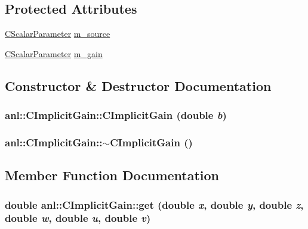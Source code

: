 \subsection*{Protected Attributes}
\begin{DoxyCompactItemize}
\item 
\hyperlink{classanl_1_1CScalarParameter}{CScalarParameter} \hyperlink{classanl_1_1CImplicitGain_aa89db53619f2caf1ef0dc1326694ba25}{m\_\-source}
\item 
\hyperlink{classanl_1_1CScalarParameter}{CScalarParameter} \hyperlink{classanl_1_1CImplicitGain_ac25c14cb85588a9449a3e0f3b0b35125}{m\_\-gain}
\end{DoxyCompactItemize}


\subsection{Constructor \& Destructor Documentation}
\hypertarget{classanl_1_1CImplicitGain_a5ebbb4ec7a16135c9ecad481ccc85ce2}{
\subsubsection[{CImplicitGain}]{\setlength{\rightskip}{0pt plus 5cm}anl::CImplicitGain::CImplicitGain (double {\em b})}}
\label{classanl_1_1CImplicitGain_a5ebbb4ec7a16135c9ecad481ccc85ce2}
\hypertarget{classanl_1_1CImplicitGain_a156654b778ec4b9ae3c8e43ea53c0c9f}{
\subsubsection[{$\sim$CImplicitGain}]{\setlength{\rightskip}{0pt plus 5cm}anl::CImplicitGain::$\sim$CImplicitGain ()}}
\label{classanl_1_1CImplicitGain_a156654b778ec4b9ae3c8e43ea53c0c9f}


\subsection{Member Function Documentation}
\hypertarget{classanl_1_1CImplicitGain_a018e5eb3dae755a618400bfeb7798c7c}{
\subsubsection[{get}]{\setlength{\rightskip}{0pt plus 5cm}double anl::CImplicitGain::get (double {\em x}, \/  double {\em y}, \/  double {\em z}, \/  double {\em w}, \/  double {\em u}, \/  double {\em v})}}
\label{classanl_1_1CImplicitGain_a018e5eb3dae755a618400bfeb7798c7c}



